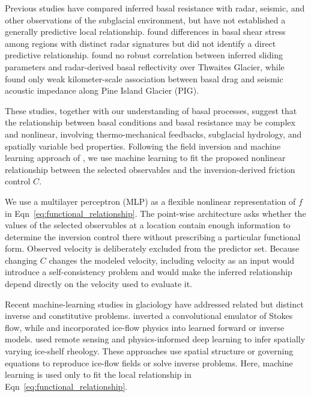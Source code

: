 \documentclass[review,jog]{igs}
\begin{document}
Previous studies have compared inferred basal resistance with radar, seismic,
and other observations of the subglacial environment, but have not established
a generally predictive local relationship. \citet{haris2024can} found
differences in basal shear stress among regions with distinct radar signatures
but did not identify a direct predictive relationship.
\citet{das2023quest} found no robust correlation between inferred sliding
parameters and radar-derived basal reflectivity over Thwaites Glacier, while
\citet{kyrke2017can} found only weak kilometer-scale association between basal
drag and seismic acoustic impedance along Pine Island Glacier (PIG).

These studies, together with our understanding of basal processes, suggest that
the relationship between basal conditions and basal resistance may be complex
and nonlinear, involving thermo-mechanical feedbacks, subglacial hydrology, and
spatially variable bed properties. Following the field inversion and machine
learning approach of \citet{parish2016paradigm}, we use machine learning to fit
the proposed nonlinear relationship between the selected observables and the
inversion-derived friction control $C$.

We use a multilayer perceptron (MLP) as a flexible nonlinear representation of $f$ in Eqn~\ref{eq:functional_relationship}. The point-wise architecture asks whether the values of the selected observables at a location contain enough information to determine the inversion control there without prescribing a particular functional form. Observed velocity is deliberately excluded from the predictor set. Because changing $C$ changes the modeled velocity, including velocity as an input would introduce a self-consistency problem and would make the inferred relationship depend directly on the velocity used to evaluate it.

Recent machine-learning studies in glaciology have addressed related but distinct inverse and constitutive problems. \citet{jouvet2023inversion} inverted a convolutional emulator of Stokes flow, while \citet{jouvet2023ice} and \citet{cheng2024forward} incorporated ice-flow physics into learned forward or inverse models. \citet{wang2025deep} used remote sensing and physics-informed deep learning to infer spatially varying ice-shelf rheology. These approaches use spatial structure or governing equations to reproduce ice-flow fields or solve inverse problems. Here, machine learning is used only to fit the local relationship in Eqn~\ref{eq:functional_relationship}.
\end{document}
